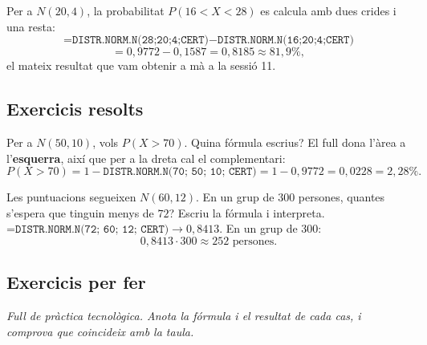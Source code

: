 \begin{exemple}
Per a $N(20,4)$, la probabilitat $P(16<X<28)$ es calcula amb dues crides i una resta:
\[
\texttt{=DISTR.NORM.N(28;20;4;CERT)}-\texttt{DISTR.NORM.N(16;20;4;CERT)}
\]
\[
=0,9772-0,1587=0,8185\approx 81,9\%,
\]
el mateix resultat que vam obtenir a mà a la sessió 11.
\end{exemple}

\subsection{Exercicis resolts}

\begin{exresolt}
Per a $N(50,10)$, vols $P(X>70)$. Quina fórmula escrius?
\solucio
El full dona l'àrea a l'\textbf{esquerra}, així que per a la dreta cal el complementari:
\[
P(X>70)=1-\texttt{DISTR.NORM.N(70;\ 50;\ 10;\ CERT)}=1-0,9772=0,0228=2,28\%.
\]
\end{exresolt}

\begin{exresolt}
Les puntuacions segueixen $N(60,12)$. En un grup de $300$ persones, quantes s'espera que
tinguin menys de $72$? Escriu la fórmula i interpreta.
\solucio
$\texttt{=DISTR.NORM.N(72;\ 60;\ 12;\ CERT)}\to 0,8413$. En un grup de $300$:
\[
0,8413\cdot 300\approx 252 \text{ persones}.
\]
\end{exresolt}

\subsection{Exercicis per fer}

\noindent\textit{Full de pràctica tecnològica. Anota la fórmula i el resultat de cada
cas, i comprova que coincideix amb la taula.}

